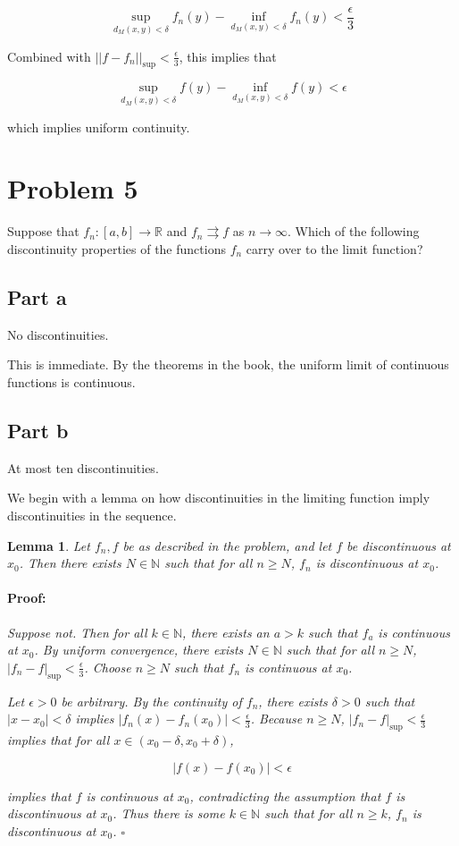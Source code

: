 \documentclass{article}
\newenvironment{proof}{\paragraph{Proof:}}{\hfill$\square$}
\newtheorem{lemma}[theorem]{Lemma}
\newcommand{\R}{\mathbb{R}}
\newcommand{\N}{\mathbb{N}}
\begin{document}
\[
\sup_{d_M(x, y) < \delta} f_n(y) - \inf_{d_M(x, y) < \delta} f_n(y) < \frac{\epsilon}{3}
\]

Combined with $||f - f_n||_{\sup} < \frac{\epsilon}{3}$, this implies that

\[
\sup_{d_M(x, y) < \delta} f(y) - \inf_{d_M(x, y) < \delta} f(y) < \epsilon
\]

which implies uniform continuity.

\section*{Problem 5}

Suppose that $f_n: [a, b] \rightarrow \R$ and $f_n \rightrightarrows f$ as $n \rightarrow \infty$. Which of the following discontinuity properties of the functions $f_n$ carry over to the limit function?

\subsection*{Part a}

No discontinuities.

This is immediate. By the theorems in the book, the uniform limit of continuous functions is continuous.

\subsection*{Part b}

At most ten discontinuities.

We begin with a lemma on how discontinuities in the limiting function imply discontinuities in the sequence.

\begin{lemma}
\label{FDiscontinuousImpliesFnDiscontinuous}
Let $f_n, f$ be as described in the problem, and let $f$ be discontinuous at $x_0$. Then there exists $N \in \N$ such that for all $n \geq N$, $f_n$ is discontinuous at $x_0$.

\begin{proof}
Suppose not. Then for all $k \in \N$, there exists an $a > k$ such that $f_a$ is continuous at $x_0$.  By uniform convergence, there exists $N \in \N$ such that for all $n \geq N$, $|f_n - f|_{\sup} < \frac{\epsilon}{3}$. Choose $n \geq N$ such that $f_n$ is continuous at $x_0$.

Let $\epsilon > 0$ be arbitrary. By the continuity of $f_n$, there exists $\delta > 0$ such that $|x-x_0| < \delta$ implies $|f_n(x) - f_n(x_0)| < \frac{\epsilon}{3}$. Because $n \geq N$, $|f_n - f|_{\sup} < \frac{\epsilon}{3}$ implies that for all $x \in (x_0-\delta, x_0 + \delta)$,

\[
|f(x) - f(x_0)| < \epsilon
\]

implies that $f$ is continuous at $x_0$, contradicting the assumption that $f$ is discontinuous at $x_0$. Thus there is some $k \in \N$ such that for all $n \geq k$, $f_n$ is discontinuous at $x_0$.
\end{proof}
\end{lemma}
\end{document}

